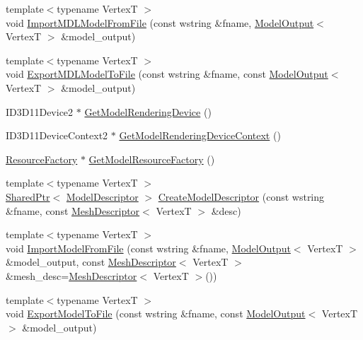 \begin{DoxyCompactItemize}
{\footnotesize template$<$typename VertexT $>$ }\\void \hyperlink{namespacemage_a8eae2acc25c819aa8973e206a7b84b9f}{Import\+M\+D\+L\+Model\+From\+File} (const wstring \&fname, \hyperlink{structmage_1_1_model_output}{Model\+Output}$<$ VertexT $>$ \&model\+\_\+output)
\item 
{\footnotesize template$<$typename VertexT $>$ }\\void \hyperlink{namespacemage_a1e8cf202593cc54387c6d735220ffc0e}{Export\+M\+D\+L\+Model\+To\+File} (const wstring \&fname, const \hyperlink{structmage_1_1_model_output}{Model\+Output}$<$ VertexT $>$ \&model\+\_\+output)
\item 
I\+D3\+D11\+Device2 $\ast$ \hyperlink{namespacemage_aca16dcb4637f074bb6e33d4ba7929686}{Get\+Model\+Rendering\+Device} ()
\item 
I\+D3\+D11\+Device\+Context2 $\ast$ \hyperlink{namespacemage_a1d373a08e09ec19944bf23feb4688b7e}{Get\+Model\+Rendering\+Device\+Context} ()
\item 
\hyperlink{classmage_1_1_resource_factory}{Resource\+Factory} $\ast$ \hyperlink{namespacemage_a51b4df46661a9038c0d2a14cb3fbe483}{Get\+Model\+Resource\+Factory} ()
\item 
{\footnotesize template$<$typename VertexT $>$ }\\\hyperlink{namespacemage_a1e01ae66713838a7a67d30e44c67703e}{Shared\+Ptr}$<$ \hyperlink{classmage_1_1_model_descriptor}{Model\+Descriptor} $>$ \hyperlink{namespacemage_a8cc26f80d3cb6f3d457bb06942880d84}{Create\+Model\+Descriptor} (const wstring \&fname, const \hyperlink{structmage_1_1_mesh_descriptor}{Mesh\+Descriptor}$<$ VertexT $>$ \&desc)
\item 
{\footnotesize template$<$typename VertexT $>$ }\\void \hyperlink{namespacemage_a3b43f166d61c14d680b28614da17ac2b}{Import\+Model\+From\+File} (const wstring \&fname, \hyperlink{structmage_1_1_model_output}{Model\+Output}$<$ VertexT $>$ \&model\+\_\+output, const \hyperlink{structmage_1_1_mesh_descriptor}{Mesh\+Descriptor}$<$ VertexT $>$ \&mesh\+\_\+desc=\hyperlink{structmage_1_1_mesh_descriptor}{Mesh\+Descriptor}$<$ VertexT $>$())
\item 
{\footnotesize template$<$typename VertexT $>$ }\\void \hyperlink{namespacemage_a3cb120c707ba8db950082a33d76b3ec8}{Export\+Model\+To\+File} (const wstring \&fname, const \hyperlink{structmage_1_1_model_output}{Model\+Output}$<$ VertexT $>$ \&model\+\_\+output)
\item 

\end{DoxyCompactItemize}
